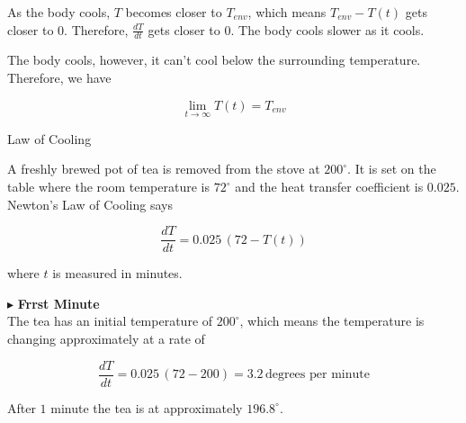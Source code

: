 \documentclass{ximera}
\begin{document}
\begin{observation}


As the body cools, $T$ becomes closer to $T_{env}$, which means  $T_{env} - T(t)$ gets closer to $0$.  Therefore, $\frac{dT}{dt}$ gets closer to $0$.  The body cools slower as it cools.
\end{observation}



\begin{observation}


The body cools, however, it can't cool below the surrounding temperature. Therefore, we have

\[
\lim\limits_{t \to \infty} T(t) = T_{env}
\]

\end{observation}








\begin{example} Law of Cooling 



A freshly brewed pot of tea is removed from the stove at $200^{\circ}$.  It is set on the table where the room temperature is $72^{\circ}$ and the heat transfer coefficient is $0.025$. \\


Newton's Law of Cooling says

\[
\frac{dT}{dt} = 0.025 \, (72 - T(t))
\]


where $t$ is measured in minutes.


$\blacktriangleright$ \textbf{Frrst Minute} \\

The tea has an initial temperature of $200^{\circ}$, which means the temperature is changing approximately at a rate of 


\[
\frac{dT}{dt} = 0.025 \, (72 - 200) = 3.2 \, \text{degrees per minute}
\]


After $1$ minute the tea is at approximately $196.8^{\circ}$.




\end{example}
\end{document}
